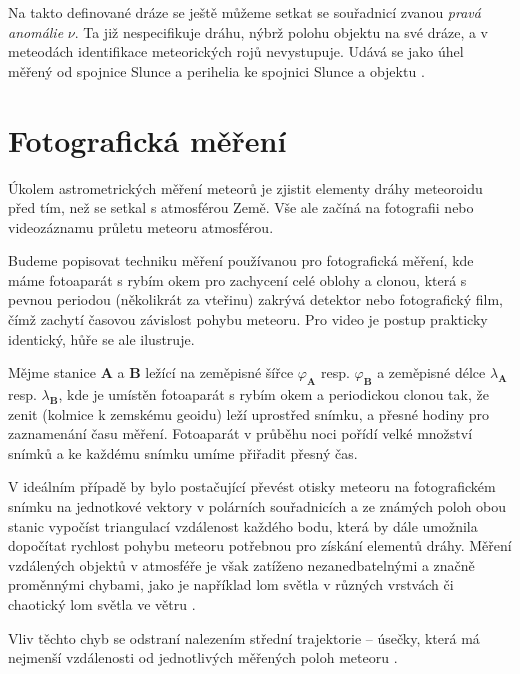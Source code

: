 \medskip

Na takto definované dráze se ještě můžeme setkat se souřadnicí zvanou \textit{pravá anomálie} $\nu$. Ta již nespecifikuje dráhu, nýbrž polohu objektu na své dráze, a v meteodách identifikace meteorických rojů nevystupuje. Udává se jako úhel měřený od spojnice Slunce a perihelia ke spojnici Slunce a objektu \cite{astro}.

\section{Fotografická měření}\label{sec:photography}
Úkolem astrometrických měření meteorů je zjistit elementy dráhy meteoroidu před tím, než se setkal s atmosférou Země. Vše ale začíná na fotografii nebo videozáznamu průletu meteoru atmosférou.

Budeme popisovat techniku měření používanou pro fotografická měření, kde máme fotoaparát s rybím okem pro zachycení celé oblohy a clonou, která s pevnou periodou (několikrát za vteřinu) zakrývá detektor nebo fotografický film, čímž zachytí časovou závislost pohybu meteoru.  Pro video je postup prakticky identický, hůře se ale ilustruje.

\medskip

Mějme stanice \textbf{A} a \textbf{B} ležící na zeměpisné šířce $\varphi_\mathbf{A}$ resp. $\varphi_\mathbf{B}$ a zeměpisné délce $\lambda_\mathbf{A}$ resp. $\lambda_\mathbf{B}$, kde je umístěn fotoaparát s rybím okem a periodickou clonou tak, že zenit (kolmice k zemskému geoidu) leží uprostřed snímku, a přesné hodiny pro zaznamenání času měření. Fotoaparát v průběhu noci pořídí velké množství snímků a ke každému snímku umíme přiřadit přesný čas.

\smallskip

V ideálním případě by bylo postačující převést otisky meteoru na fotografickém snímku na jednotkové vektory v polárních souřadnicích a ze známých poloh obou stanic vypočíst triangulací vzdálenost každého bodu, která by dále umožnila dopočítat rychlost pohybu meteoru potřebnou pro získání elementů dráhy. Měření vzdálených objektů v atmosféře je však zatíženo nezanedbatelnými a značně proměnnými chybami, jako je například lom světla v různých vrstvách či chaotický lom světla ve větru \cite{radiosurvey}.

Vliv těchto chyb se odstraní nalezením střední trajektorie -- úsečky, která má nejmenší vzdálenosti od jednotlivých měřených poloh meteoru \cite{ceplecha}.

